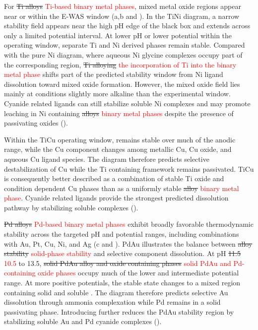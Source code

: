 \documentclass[twoside,twocolumn,9pt]{article}
\begin{document}
For \sout{Ti alloys} \textcolor{red}{Ti-based binary metal phases}, mixed metal oxide regions appear near or within the E-WAS window (a,b and ). In the TiNi diagram, a narrow  stability field appears near the high pH edge of the black box and extends across only a limited potential interval. At lower pH or lower potential within the operating window, separate Ti and Ni derived phases remain stable. Compared with the pure Ni diagram, where aqueous Ni glycine complexes occupy part of the corresponding region, \sout{Ti alloying} \textcolor{red}{the incorporation of Ti into the binary metal phase} shifts part of the predicted stability window from Ni ligand dissolution toward mixed oxide formation. However, the mixed oxide field lies mainly at conditions slightly more alkaline than the experimental window. Cyanide related ligands can still stabilize soluble Ni complexes and may promote leaching in Ni containing \sout{alloys} \textcolor{red}{binary metal phases} despite the presence of passivating oxides ().

Within the TiCu operating window,  remains stable over much of the anodic range, while the Cu component changes among metallic Cu, Cu oxide, and aqueous Cu ligand species. The diagram therefore predicts selective destabilization of Cu while the Ti containing framework remains passivated. TiCu is consequently better described as a combination of stable Ti oxide and condition dependent Cu phases than as a uniformly stable \sout{alloy} \textcolor{red}{binary metal phase}. Cyanide related ligands provide the strongest predicted dissolution pathway by stabilizing soluble  complexes ().

\sout{Pd alloys} \textcolor{red}{Pd-based binary metal phases} exhibit broadly favorable thermodynamic stability across the targeted pH and potential ranges, including combinations with Au, Pt, Cu, Ni, and Ag (c and ). PdAu illustrates the balance between \sout{alloy stability} \textcolor{red}{solid-phase stability} and selective component dissolution. At pH \sout{11.5} \textcolor{red}{10.5} to 13.5, \sout{solid PdAu alloy and oxide containing phases} \textcolor{red}{solid PdAu and Pd-containing oxide phases} occupy much of the lower and intermediate potential range. At more positive potentials, the stable state changes to a mixed region containing solid  and soluble . The diagram therefore predicts selective Au dissolution through ammonia complexation while Pd remains in a solid passivating phase. Introducing  further reduces the PdAu stability region by stabilizing soluble Au and Pd cyanide complexes ().
\end{document}
